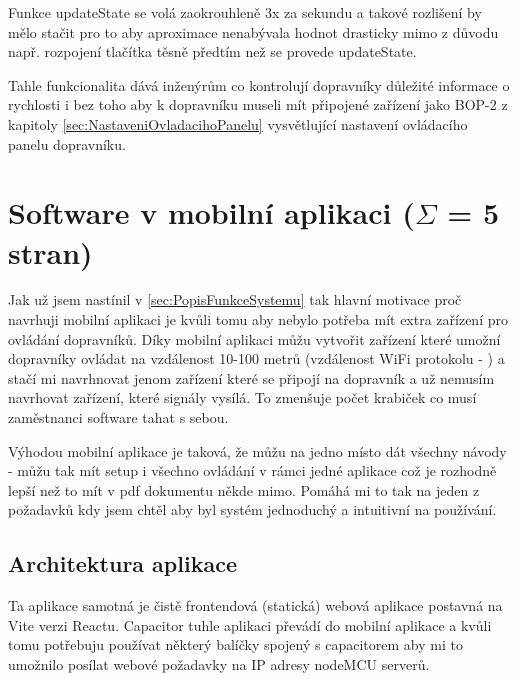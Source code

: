Funkce updateState se volá zaokrouhleně 3x za sekundu a takové rozlišení by mělo stačit pro to aby aproximace nenabývala hodnot drasticky mimo z důvodu např. rozpojení tlačítka těsně předtím než se provede updateState.

Tahle funkcionalita dává inženýrům co kontrolují dopravníky důležité informace o rychlosti i bez toho aby k dopravníku museli mít připojené zařízení jako BOP-2 z kapitoly \ref{sec:NastaveniOvladacihoPanelu} vysvětlující nastavení ovládacího panelu dopravníku.

\section{Software v mobilní aplikaci ($\Sigma$ = 5 stran)}\label{sec:SoftwareVMobilniAplikaci}

Jak už jsem nastínil v \ref{sec:PopisFunkceSystemu} tak hlavní motivace proč navrhuji mobilní aplikaci je kvůli tomu aby nebylo potřeba mít extra zařízení pro ovládání dopravníků. Díky mobilní aplikaci můžu vytvořit zařízení které umožní dopravníky ovládat na vzdálenost 10-100 metrů (vzdálenost WiFi protokolu - ) a stačí mi navrhnovat jenom zařízení které se připojí na dopravník a už nemusím navrhovat zařízení, které signály vysílá. To zmenšuje počet krabiček co musí zaměstnanci software tahat s sebou.

Výhodou mobilní aplikace je taková, že můžu na jedno místo dát všechny návody - můžu tak mít setup i všechno ovládání v rámci jedné aplikace což je rozhodně lepší než to mít v pdf dokumentu někde mimo. Pomáhá mi to tak na jeden z požadavků kdy jsem chtěl aby byl systém jednoduchý a intuitivní na používání.

\subsection{Architektura aplikace}

Ta aplikace samotná je čistě frontendová (statická) webová aplikace postavná na Vite verzi Reactu. Capacitor tuhle aplikaci převádí do mobilní aplikace a kvůli tomu potřebuju používat některý balíčky spojený s capacitorem aby mi to umožnilo posílat webové požadavky na IP adresy nodeMCU serverů.

